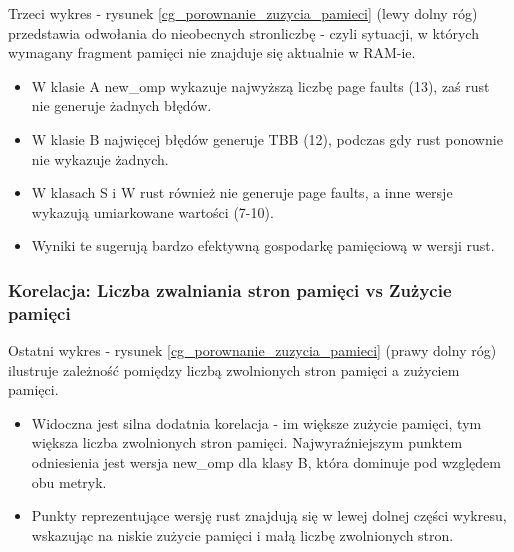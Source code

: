 Trzeci wykres - rysunek \ref{cg_porownanie_zuzycia_pamieci} (lewy dolny róg) przedstawia odwołania do nieobecnych stronliczbę  - czyli sytuacji, w których wymagany fragment pamięci nie znajduje się aktualnie w RAM-ie.
\begin{itemize}
    \item W klasie A new\_omp wykazuje najwyższą liczbę page faults (13), zaś rust nie generuje żadnych błędów.
    \item W klasie B najwięcej błędów generuje TBB (12), podczas gdy rust ponownie nie wykazuje żadnych.
    \item W klasach S i W rust również nie generuje page faults, a inne wersje wykazują umiarkowane wartości (7-10).
    \item Wyniki te sugerują bardzo efektywną gospodarkę pamięciową w wersji rust.
\end{itemize}

\subsubsection{Korelacja: Liczba zwalniania stron pamięci vs Zużycie pamięci}
Ostatni wykres - rysunek \ref{cg_porownanie_zuzycia_pamieci} (prawy dolny róg) ilustruje zależność pomiędzy liczbą zwolnionych stron pamięci a zużyciem pamięci.
\begin{itemize}
    \item Widoczna jest silna dodatnia korelacja - im większe zużycie pamięci, tym większa liczba zwolnionych stron pamięci. Najwyraźniejszym punktem odniesienia jest wersja new\_omp dla klasy B, która dominuje pod względem obu metryk.
    \item Punkty reprezentujące wersję rust znajdują się w lewej dolnej części wykresu, wskazując na niskie zużycie pamięci i małą liczbę zwolnionych stron.
\end{itemize}

